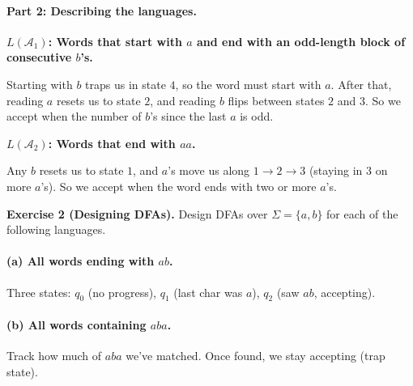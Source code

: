 \documentclass{article}
\theoremstyle{theorem}
\theoremstyle{definition}
\theoremstyle{remark}
\begin{document}
\paragraph{Part 2: Describing the languages.}

\textbf{$L(\mathcal{A}_1)$: Words that start with $a$ and end with an odd-length block of consecutive $b$'s.}

Starting with $b$ traps us in state $4$, so the word must start with $a$. After that, reading $a$ resets us to state $2$, and reading $b$ flips between states $2$ and $3$. So we accept when the number of $b$'s since the last $a$ is odd.

\textbf{$L(\mathcal{A}_2)$: Words that end with $aa$.}

Any $b$ resets us to state $1$, and $a$'s move us along $1 \to 2 \to 3$ (staying in $3$ on more $a$'s). So we accept when the word ends with two or more $a$'s.

\bigskip

\textbf{Exercise 2 (Designing DFAs).}
Design DFAs over $\Sigma = \{a,b\}$ for each of the following languages.

\paragraph{(a) All words ending with $ab$.} Three states: $q_0$ (no progress), $q_1$ (last char was $a$), $q_2$ (saw $ab$, accepting).

\begin{center}
\end{center}

\paragraph{(b) All words containing $aba$.} Track how much of $aba$ we've matched. Once found, we stay accepting (trap state).

\begin{center}
\end{center}
\end{document}
